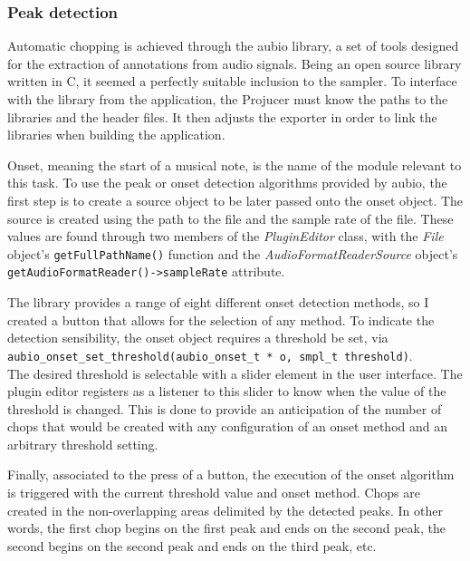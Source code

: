 \documentclass[12pt, a4paper, hidelinks]{article}
\begin{document}
	\subsubsection{Peak detection}
	Automatic chopping is achieved through the aubio library, a set of tools designed for the extraction of annotations from audio signals\cite{aubio}. Being an open source library written in C, it seemed a perfectly suitable inclusion to the sampler. To interface with the library from the application, the Projucer must know the paths to the libraries and the header files. It then adjusts the exporter in order to link the libraries when building the application.\par	
	Onset, meaning the start of a musical note, is the name of the module relevant to this task. To use the peak or onset detection algorithms provided by aubio, the first step is to create a source object to be later passed onto the onset object. The source is created using the path to the file and the sample rate of the file. These values are found through two members of the \textit{PluginEditor} class, with the \textit{File} object's  \texttt{getFullPathName()} function and the \textit{AudioFormatReaderSource} object's \texttt{getAudioFormatReader()->sampleRate} attribute. \par	
	The library provides a range of eight different onset detection methods, so I created a button that allows for the selection of any method. To indicate the detection sensibility, the onset object requires a threshold be set, via\\
	\texttt{aubio\_onset\_set\_threshold(aubio\_onset\_t * o, smpl\_t threshold)}.\\
	The desired threshold is selectable with a slider element in the user interface. The plugin editor registers as a listener to this slider to know when the value of the threshold is changed. This is done to provide an anticipation of the number of chops that would be created with any configuration of an onset method and an arbitrary threshold setting. \par 	Finally, associated to the press of a button, the execution of the onset algorithm is triggered with the current threshold value and onset method. Chops are created in the non-overlapping areas delimited by the detected peaks. In other words, the first chop begins on the first peak and ends on the second peak, the second begins on the second peak and ends on the third peak, etc.
	
	
\end{document}
